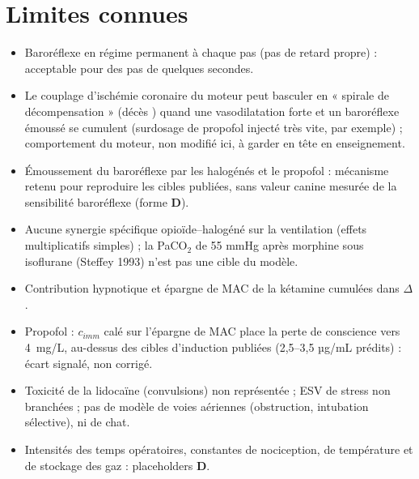 \documentclass[10pt,a4paper]{article}
\newcommand{\vp}[1]{\text{\texttt{\detokenize{#1}}}}
\newcommand{\evD}{\textcolor{red!70!black}{\textbf{D}}}
\begin{document}
\section{Limites connues}
\begin{itemize}
\item Baroréflexe en régime permanent à chaque pas (pas de retard propre) : acceptable pour des pas de quelques secondes.
\item Le couplage d'ischémie coronaire du moteur peut basculer en « spirale de décompensation » (décès \vp{vicious_circle}) quand une
vasodilatation forte et un baroréflexe émoussé se cumulent (surdosage de propofol injecté très vite, par exemple) ; comportement du moteur,
non modifié ici, à garder en tête en enseignement.
\item Émoussement du baroréflexe par les halogénés et le propofol : mécanisme retenu pour reproduire les cibles publiées, sans valeur canine
mesurée de la sensibilité baroréflexe (forme \evD).
\item Aucune synergie spécifique opioïde--halogéné sur la ventilation (effets multiplicatifs simples) ; la PaCO$_2$ de 55 mmHg
après morphine sous isoflurane (Steffey 1993) n'est pas une cible du modèle.
\item Contribution hypnotique et épargne de MAC de la kétamine cumulées dans $\Delta$.
\item Propofol : $c_{imm}$ calé sur l'épargne de MAC place la perte de conscience vers \SI{4}{mg/L}, au-dessus des cibles d'induction
publiées (2,5--3,5 µg/mL prédits) : écart signalé, non corrigé.
\item Toxicité de la lidocaïne (convulsions) non représentée ; ESV de stress non branchées ; pas de modèle de voies aériennes
(obstruction, intubation sélective), ni de chat.
\item Intensités des temps opératoires, constantes de nociception, de température et de stockage des gaz : placeholders \evD.
\end{itemize}
\end{document}
